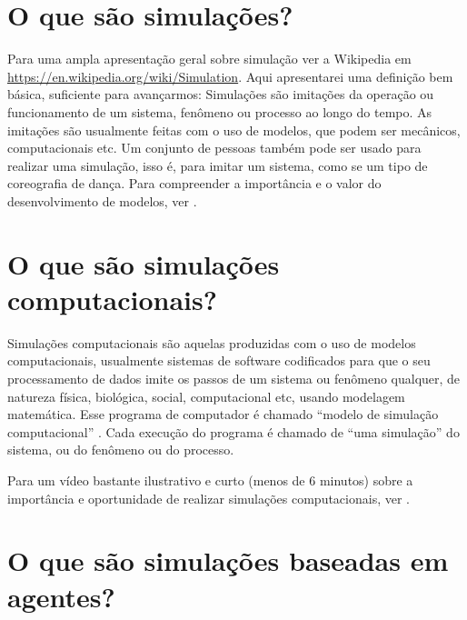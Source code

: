 \section{O que são simulações?}

Para uma ampla apresentação geral sobre simulação ver a Wikipedia em \url{https://en.wikipedia.org/wiki/Simulation}. Aqui apresentarei uma definição bem básica, suficiente para avançarmos:
Simulações são imitações da operação ou funcionamento de um sistema, fenômeno ou processo ao longo do tempo. 
As imitações são usualmente feitas com o uso de modelos, que podem ser mecânicos, computacionais etc. Um conjunto de pessoas também pode ser usado para realizar uma simulação, isso é, para imitar um sistema, como se um tipo de coreografia de dança. 
Para compreender a importância e o valor do desenvolvimento de modelos, ver \citet{epstein_why_2008}.

\section{O que são simulações computacionais?}

Simulações computacionais são aquelas produzidas com o uso de modelos computacionais, usualmente sistemas de software codificados para que o seu processamento de dados imite os passos de um sistema ou fenômeno qualquer, de natureza física, biológica, social, computacional etc, usando modelagem matemática. Esse programa de computador é chamado ``modelo de simulação computacional''
\citep{winsberg_computer_2019}. Cada execução do programa é chamado de ``uma simulação'' do sistema, ou do fenômeno ou do processo.

Para um vídeo bastante ilustrativo e curto (menos de 6 minutos) sobre a importância e oportunidade de realizar simulações computacionais, ver \citet{eaglin_introduction_2013}.

\section{O que são simulações baseadas em agentes?}

